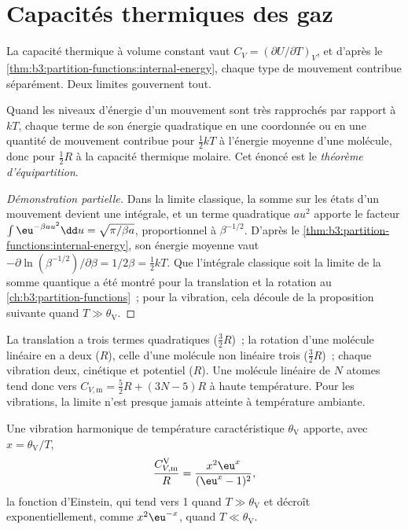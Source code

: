 \section{Capacités thermiques des gaz}

La capacité thermique à volume constant vaut $C_V = (\partial U/\partial T)_V$, et
d'après le \cref{thm:b3:partition-functions:internal-energy}, chaque type
de mouvement contribue séparément. Deux limites gouvernent tout.

\begin{theorem}\label{thm:b3:statistical-thermo-applied:equipartition}
Quand les niveaux d'énergie d'un mouvement sont très rapprochés par
rapport à $kT$, chaque terme de son énergie quadratique en une
coordonnée ou en une quantité de mouvement contribue pour
$\frac12kT$ à l'énergie moyenne d'une molécule, donc pour $\frac12R$ à
la capacité thermique molaire. Cet énoncé est le \emph{théorème
d'équipartition}.
\end{theorem}

\begin{proof}[Démonstration partielle]
Dans la limite classique, la somme sur les états d'un mouvement devient
une intégrale, et un terme quadratique $a u^2$ apporte le facteur
$\int\eu^{-\beta au^2}\dd u =
\sqrt{\pi/\beta a}$, proportionnel à $\beta^{-1/2}$. D'après le
\cref{thm:b3:partition-functions:internal-energy}, son énergie moyenne
vaut $-\partial\ln(\beta^{-1/2})/\partial\beta = 1/2\beta = \frac12kT$. Que
l'intégrale classique soit la limite de la somme quantique a été montré
pour la translation et la rotation au
\cref{ch:b3:partition-functions}~; pour la vibration, cela découle de la
proposition suivante quand $T \gg \theta_{\mathrm V}$.
\end{proof}

La translation a trois termes quadratiques ($\frac32R$)~; la rotation
d'une molécule linéaire en a deux ($R$), celle d'une molécule non
linéaire trois ($\frac32R$)~; chaque vibration deux, cinétique et
potentiel ($R$). Une molécule linéaire de $N$ atomes tend donc vers
$C_{V,\mathrm m} = \frac52R + (3N - 5)R$ à haute température. Pour les
vibrations, la limite n'est presque jamais atteinte à température
ambiante.

\begin{proposition}\label{prop:b3:statistical-thermo-applied:cv-vib}
Une vibration harmonique de température caractéristique
$\theta_{\mathrm V}$ apporte, avec
$x = \theta_{\mathrm V}/T$,
\[
  \frac{C_{V,\mathrm m}^{\mathrm V}}{R} = \frac{x^2\eu^x}{(\eu^x - 1)^2},
\]
la fonction d'Einstein, qui tend vers 1 quand $T \gg \theta_{\mathrm V}$
et décroît exponentiellement, comme $x^2\eu^{-x}$, quand
$T \ll \theta_{\mathrm V}$.
\end{proposition}

